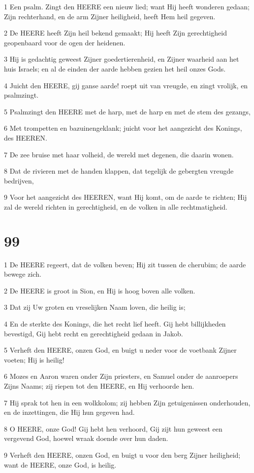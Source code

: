 \par 1 Een psalm. Zingt den HEERE een nieuw lied; want Hij heeft wonderen gedaan; Zijn rechterhand, en de arm Zijner heiligheid, heeft Hem heil gegeven.
\par 2 De HEERE heeft Zijn heil bekend gemaakt; Hij heeft Zijn gerechtigheid geopenbaard voor de ogen der heidenen.
\par 3 Hij is gedachtig geweest Zijner goedertierenheid, en Zijner waarheid aan het huis Israels; en al de einden der aarde hebben gezien het heil onzes Gods.
\par 4 Juicht den HEERE, gij ganse aarde! roept uit van vreugde, en zingt vrolijk, en psalmzingt.
\par 5 Psalmzingt den HEERE met de harp, met de harp en met de stem des gezangs,
\par 6 Met trompetten en bazuinengeklank; juicht voor het aangezicht des Konings, des HEEREN.
\par 7 De zee bruise met haar volheid, de wereld met degenen, die daarin wonen.
\par 8 Dat de rivieren met de handen klappen, dat tegelijk de gebergten vreugde bedrijven,
\par 9 Voor het aangezicht des HEEREN, want Hij komt, om de aarde te richten; Hij zal de wereld richten in gerechtigheid, en de volken in alle rechtmatigheid.

\chapter{99}

\par 1 De HEERE regeert, dat de volken beven; Hij zit tussen de cherubim; de aarde bewege zich.
\par 2 De HEERE is groot in Sion, en Hij is hoog boven alle volken.
\par 3 Dat zij Uw groten en vreselijken Naam loven, die heilig is;
\par 4 En de sterkte des Konings, die het recht lief heeft. Gij hebt billijkheden bevestigd, Gij hebt recht en gerechtigheid gedaan in Jakob.
\par 5 Verheft den HEERE, onzen God, en buigt u neder voor de voetbank Zijner voeten; Hij is heilig!
\par 6 Mozes en Aaron waren onder Zijn priesters, en Samuel onder de aanroepers Zijns Naams; zij riepen tot den HEERE, en Hij verhoorde hen.
\par 7 Hij sprak tot hen in een wolkkolom; zij hebben Zijn getuigenissen onderhouden, en de inzettingen, die Hij hun gegeven had.
\par 8 O HEERE, onze God! Gij hebt hen verhoord, Gij zijt hun geweest een vergevend God, hoewel wraak doende over hun daden.
\par 9 Verheft den HEERE, onzen God, en buigt u voor den berg Zijner heiligheid; want de HEERE, onze God, is heilig.

